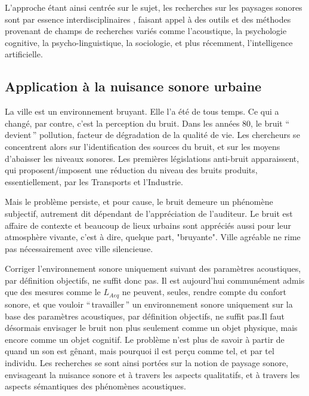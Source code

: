 L'approche étant ainsi centrée sur le sujet, les recherches sur les paysages sonores sont par essence interdisciplinaires \citep{davies2013perception,aletta2016soundscape}, faisant appel à des outils et des méthodes provenant de champs de recherches variés comme l'acoustique, la psychologie cognitive, la psycho-linguistique, la sociologie, et plus récemment, l’intelligence artificielle.

\subsection{Application à la nuisance sonore urbaine}

La ville est un environnement bruyant. Elle l'a été de tous temps.  Ce qui a changé, par contre, c'est la perception du bruit. Dans les années 80, le bruit ``\,devient\,'' pollution, facteur de dégradation de la qualité de vie. Les chercheurs se concentrent alors sur l'identification des sources du bruit, et sur les moyens d'abaisser les niveaux sonores. Les premières législations anti-bruit apparaissent, qui proposent/imposent une réduction du niveau des bruits produits, essentiellement, par les Transports et l'Industrie.

Mais le problème persiste, et pour cause, le bruit demeure un phénomène subjectif, autrement dit dépendant de l'appréciation de l'auditeur. Le bruit est affaire de contexte et beaucoup de lieux urbains sont appréciés aussi pour leur atmosphère vivante, c'est à dire, quelque part, "bruyante". Ville agréable ne rime pas nécessairement avec ville silencieuse.

Corriger l'environnement sonore uniquement suivant des paramètres acoustiques, par définition objectifs, ne suffit donc pas. Il est aujourd'hui communément admis que des mesures comme le $L_{Aeq}$ ne peuvent, seules, rendre compte du confort sonore, et que vouloir ``\,travailler\,'' un environnement sonore uniquement sur la base des paramètres acoustiques, par définition objectifs, ne suffit pas\citep{yang2005acoustic,schulte2006soundscape,kang2010semantic,aletta2016soundscape}.Il faut désormais envisager le bruit non plus seulement comme un objet physique, mais encore comme un objet cognitif\citep{guastavino_etude_2003}. Le problème n'est plus de savoir à partir de quand un son est gênant, mais pourquoi il est perçu comme tel, et par tel individu. Les recherches se sont ainsi portées sur la notion de paysage sonore, envisageant la nuisance sonore et à travers les aspects qualitatifs, et à travers les aspects sémantiques des phénomènes acoustiques.

